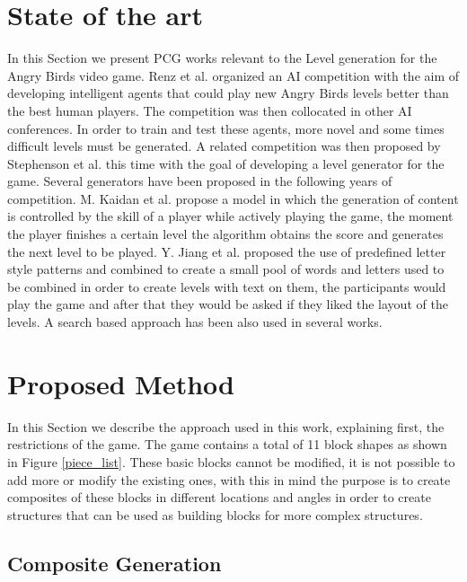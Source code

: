 \documentclass[conference]{IEEEtran}
\begin{document}
    
    \section{State of the art}
    \label{SoA}
    In this Section we present PCG works relevant to the Level generation for the
    Angry Birds video game. Renz et al. \cite{Renz, Renz2015TheAB} organized an AI
    competition with the aim of developing intelligent agents that could play new
    Angry Birds levels better than the best human players. The competition was then
    collocated in other AI conferences. In order to train and test these agents,
    more novel and some times difficult levels must be generated. A related
    competition was then proposed by Stephenson et al. \cite{Stephenson} this time
    with the goal of developing a level generator for the game. Several generators
    have been proposed in the following years of competition. M. Kaidan et al.
    \cite{Kaidan2015} propose a model in which the generation of content is
    controlled by the skill of a player while actively playing the game, the moment
    the player finishes a certain level the algorithm obtains the score and
    generates the next level to be played. Y. Jiang et al. \cite{Jiang2017} proposed
    the use of predefined letter style patterns and combined to create a small pool
    of words and letters used to be combined in order to create levels with text on
    them, the participants would play the game and after that they would be asked if
    they liked the layout of the levels. A search based approach has been also used
    in several works. 
    
    \section{Proposed Method}
    
    In this Section we describe the approach used in this work, explaining first,
    the restrictions of the game.
    The game contains a total of 11 block shapes as shown in Figure \ref{piece_list}.
    These basic blocks cannot be modified, it is not possible to add more or modify the existing ones,
    with this in mind the purpose is to create composites of these blocks in
    different locations and angles in order to create structures that can be used as
    building blocks for more complex structures. 
    
    \subsection{Composite Generation}
\end{document}
